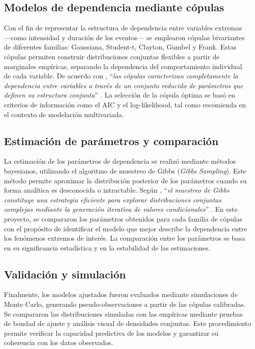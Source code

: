 \documentclass[12pt, a4paper]{article}
\begin{document}
\subsection*{Modelos de dependencia mediante cópulas}
Con el fin de representar la estructura de dependencia entre variables extremas —como intensidad y duración de los eventos— se emplearon cópulas bivariantes de diferentes familias: Gaussiana, Student-t, Clayton, Gumbel y Frank. Estas cópulas permiten construir distribuciones conjuntas flexibles a partir de marginales empíricas, separando la dependencia del comportamiento individual de cada variable. De acuerdo con , “\textit{las cópulas caracterizan completamente la dependencia entre variables a través de un conjunto reducido de parámetros que definen su estructura conjunta}” \cite[p. 57]{Nelsen2006}. La selección de la cópula óptima se basó en criterios de información como el AIC y el log-likelihood, tal como recomienda  en el contexto de modelación multivariada.

\subsection*{Estimación de parámetros y comparación}
La estimación de los parámetros de dependencia se realizó mediante métodos bayesianos, utilizando el algoritmo de muestreo de Gibbs (\textit{Gibbs Sampling}). Este método permite aproximar la distribución posterior de los parámetros cuando su forma analítica es desconocida o intractable. Según , “\textit{el muestreo de Gibbs constituye una estrategia eficiente para explorar distribuciones conjuntas complejas mediante la generación iterativa de valores condicionales}” \cite[p. 299]{Gelman2020}. En este proyecto, se compararon los parámetros obtenidos para cada familia de cópulas con el propósito de identificar el modelo que mejor describe la dependencia entre los fenómenos extremos de interés. La comparación entre los parámetros se basa en su significancia estadística y en la estabilidad de las estimaciones.

\subsection*{Validación y simulación}
Finalmente, los modelos ajustados fueron evaluados mediante simulaciones de Monte Carlo, generando pseudo-observaciones a partir de las cópulas calibradas. Se compararon las distribuciones simuladas con las empíricas mediante pruebas de bondad de ajuste y análisis visual de densidades conjuntas. Este procedimiento permite verificar la capacidad predictiva de los modelos y garantizar su coherencia con los datos observados.
\end{document}

